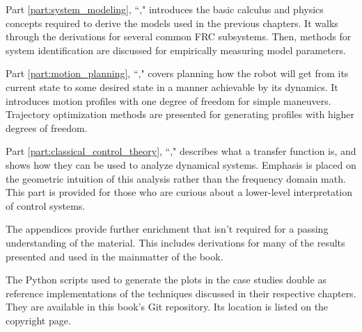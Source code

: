 Part \ref{part:system_modeling}, ``," introduces
the basic calculus and physics concepts required to derive the models used in
the previous chapters. It walks through the derivations for several common FRC
subsystems. Then, methods for system identification are discussed for
empirically measuring model parameters.

Part \ref{part:motion_planning}, ``," covers
planning how the robot will get from its current state to some desired state in
a manner achievable by its dynamics. It introduces motion profiles with one
degree of freedom for simple maneuvers. Trajectory optimization methods are
presented for generating profiles with higher degrees of freedom.

Part \ref{part:classical_control_theory},
``," describes what a transfer function
is, and shows how they can be used to analyze dynamical systems. Emphasis is
placed on the geometric intuition of this analysis rather than the frequency
domain math. This part is provided for those who are curious about a lower-level
interpretation of control systems.

The appendices provide further enrichment that isn't required for a passing
understanding of the material. This includes derivations for many of the results
presented and used in the mainmatter of the book.

The Python scripts used to generate the plots in the case studies double as
reference implementations of the techniques discussed in their respective
chapters. They are available in this book's Git repository. Its location is
listed on the copyright page.
